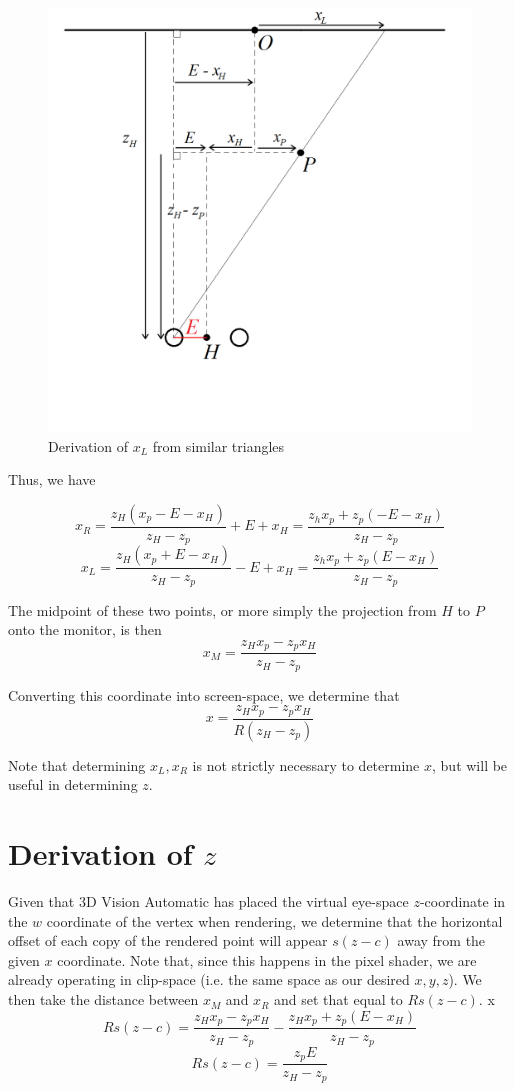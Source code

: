 \documentclass{article}
\begin{document}
\begin{figure}
\includegraphics[width=\textwidth]{diagram.png}
\caption{Derivation of $x_L$ from similar triangles}
\label{fig:diag}
\end{figure}

Thus, we have 

$$x_R = \frac{z_H(x_p - E - x_H)}{z_H - z_p} + E + x_H = \frac{z_hx_p + z_p(-E - x_H)}{z_H - z_p}$$
$$x_L = \frac{z_H(x_p + E - x_H)}{z_H - z_p} - E + x_H = \frac{z_hx_p + z_p(E - x_H)}{z_H - z_p}$$

The midpoint of these two points, or more simply the projection from $H$ to $P$ onto the monitor, is then 
$$x_M = \frac{z_Hx_p - z_px_H}{z_H - z_p}$$

Converting this coordinate into screen-space, we determine that
$$x = \frac{z_Hx_p - z_px_H}{R(z_H - z_p)}$$

Note that determining $x_L, x_R$ is not strictly necessary to determine $x$, but will be useful in determining $z$.

\section{Derivation of $z$}
Given that 3D Vision Automatic has placed the virtual eye-space $z$-coordinate in the $w$ coordinate of the vertex when rendering, we determine that the horizontal offset of each copy of the rendered point will appear 
$s(z-c)$ away from the given $x$ coordinate. Note that, since this happens in the pixel shader, we are already operating in clip-space (i.e. the same space as our desired $x,y,z$). We then take the distance between $x_M$ and $x_R$
and set that equal to $Rs(z-c)$.
x
$$Rs(z-c) = \frac{z_Hx_p - z_px_H}{z_H - z_p} - \frac{z_Hx_p + z_p(E - x_H)}{z_H - z_p}$$
$$Rs(z-c) = \frac{z_pE}{z_H - z_p}$$
\end{document}
